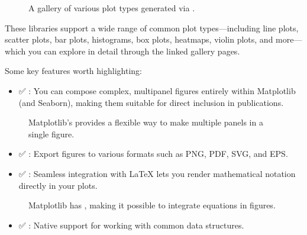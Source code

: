 \documentclass[letterpaper,10pt,english]{jupyterBook}
\let\sphinxpxdimen\pdfpxdimen\else\newdimen\sphinxpxdimen
\begin{document}
\begin{figure}[htbp]
\centering
\capstart

\noindent{}
\caption{A gallery of various plot types generated via .}\label{\detokenize{chapters/03/03b_visualization-tools:seaborn}}\end{figure}

\sphinxAtStartPar
These libraries support a wide range of common plot types—including line plots, scatter plots, bar plots, histograms, box plots, heatmaps, violin plots, and more—which you can explore in detail through the linked gallery pages.

\sphinxAtStartPar
Some key features worth highlighting:
\begin{itemize}
\item {} 
\sphinxAtStartPar
✅ : You can compose complex, multi\sphinxhyphen{}panel figures entirely within Matplotlib (and Seaborn), making them suitable for direct inclusion in publications.

\end{itemize}

\begin{figure}[htbp]
\centering
\capstart

\noindent\sphinxincludegraphics[height=300\sphinxpxdimen]{{gridspec}.png}
\caption{Matplotlib’s  provides a flexible way to make multiple panels in a single figure.}\label{\detokenize{chapters/03/03b_visualization-tools:gridspec}}\end{figure}
\begin{itemize}
\item {} 
\sphinxAtStartPar
✅ : Export figures to various formats such as PNG, PDF, SVG, and EPS.

\item {} 
\sphinxAtStartPar
✅ : Seamless integration with LaTeX lets you render mathematical notation directly in your plots.

\end{itemize}

\begin{figure}[htbp]
\centering
\capstart

\noindent\sphinxincludegraphics[height=300\sphinxpxdimen]{{equations}.png}
\caption{Matplotlib has , making it possible to integrate equations in figures.}\label{\detokenize{chapters/03/03b_visualization-tools:equations}}\end{figure}
\begin{itemize}
\item {} 
\sphinxAtStartPar
✅ : Native support for working with common data structures.

\end{itemize}
\end{document}

